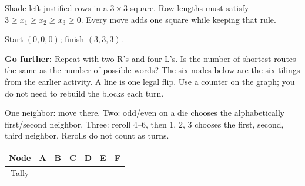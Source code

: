 \documentclass[11pt]{article}
\begin{document}
\begin{center}\begin{minipage}{.23\linewidth}\centering\RowPicture\end{minipage}\hfill\begin{minipage}{.71\linewidth}Shade left-justified rows in a \(3\times3\) square. Row lengths must satisfy \(3\geq x_1\geq x_2\geq x_3\geq0\). Every move adds one square while keeping that rule.\par Start \((0,0,0)\); finish \((3,3,3)\).\end{minipage}\end{center}
\begin{center}\ExtensionRouteTableBlank\end{center}
\textbf{Go further:} Repeat with two R's and four L's. Is the number of shortest routes the same as the number of possible words?
\StudentFooter
\newpage
{}\NameLine
The six nodes below are the six tilings from the earlier activity. A line is one legal flip. Use a counter on the graph; you do not need to rebuild the blocks each turn.
\begin{center}\WalkGraph\end{center}
{\small One neighbor: move there. Two: odd/even on a die chooses the alphabetically first/second neighbor. Three: reroll 4--6, then 1, 2, 3 chooses the first, second, third neighbor. Rerolls do not count as turns.}
\begin{center}\renewcommand{\arraystretch}{1.65}\begin{tabular}{c|p{.65in}|p{.65in}|p{.65in}|p{.65in}|p{.65in}|p{.65in}}Node&A&B&C&D&E&F\\\hline Tally&&&&&&\end{tabular}\end{center}
\end{document}
